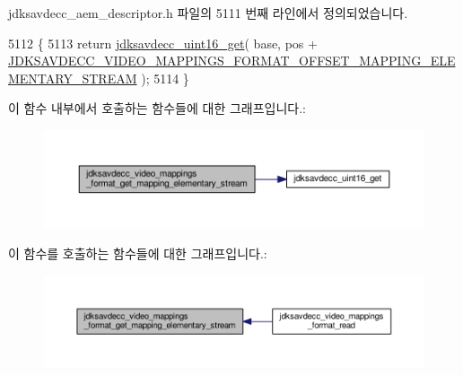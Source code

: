 jdksavdecc\+\_\+aem\+\_\+descriptor.\+h 파일의 5111 번째 라인에서 정의되었습니다.


\begin{DoxyCode}
5112 \{
5113     \textcolor{keywordflow}{return} \hyperlink{group__endian_ga3fbbbc20be954aa61e039872965b0dc9}{jdksavdecc\_uint16\_get}( base, pos + 
      \hyperlink{group__video__mappings__format_ga17fd919c614e8d21cfa763a967897642}{JDKSAVDECC\_VIDEO\_MAPPINGS\_FORMAT\_OFFSET\_MAPPING\_ELEMENTARY\_STREAM}
       );
5114 \}
\end{DoxyCode}


이 함수 내부에서 호출하는 함수들에 대한 그래프입니다.\+:
\nopagebreak
\begin{figure}[H]
\begin{center}
\leavevmode
\includegraphics[width=350pt]{group__video__mappings__format_ga95475c1d3ac88b5cb3e08c48b0f52f6b_cgraph}
\end{center}
\end{figure}




이 함수를 호출하는 함수들에 대한 그래프입니다.\+:
\nopagebreak
\begin{figure}[H]
\begin{center}
\leavevmode
\includegraphics[width=350pt]{group__video__mappings__format_ga95475c1d3ac88b5cb3e08c48b0f52f6b_icgraph}
\end{center}
\end{figure}


